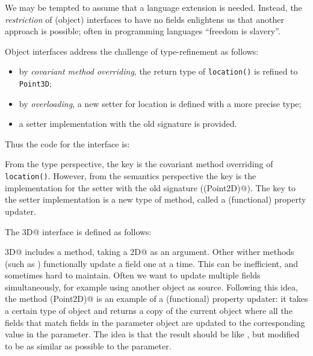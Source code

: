 We may be tempted to assume that a language extension is needed.
Instead, the \emph{restriction} of (object) interfaces to have no
fields enlightens us that another approach is possible; often in programming languages ``freedom is slavery''.

Object interfaces address the challenge of type-refinement as follows:
\begin{itemize}
\item by \emph{covariant method overriding}, the return type of
  \texttt{location()} is refined to \texttt{Point3D};
\item by \emph{overloading}, a new setter for location is defined with a more
  precise type;
\item a \Q@default@ setter implementation with the old signature is provided.
\end{itemize}

\noindent Thus the code for the \Q@Bird@ interface is:



\noindent From the type perspective, the key is the covariant method
overriding of \texttt{location()}. However, from the semantics
perspective the key is the implementation for the setter with the old
signature (\Q@location(Point2D)@). The key to the setter
implementation is a new type of \Q@with@ method, called
 a (functional) property updater.

The \Q@Point3D@ interface is defined as follows:


\noindent \Q@Point3D@ includes a
\Q@with@ method, taking a \Q@Point2D@ as an argument.
Other wither methods (such as \Q@withX@) functionally update a field one at a time.  This can be
inefficient, and sometimes hard to maintain.  Often we want to update multiple
fields simultaneously, for example using another object as source.  Following
this idea, the method \Q@with(Point2D)@ is an example of a (functional)
property updater: it takes a certain type of object and returns a copy of the
current object where all the fields that match fields in the parameter
object are updated to the corresponding value in the parameter. The idea is that
the result should be like \Q@this@, but modified to be as similar as possible to the parameter.

